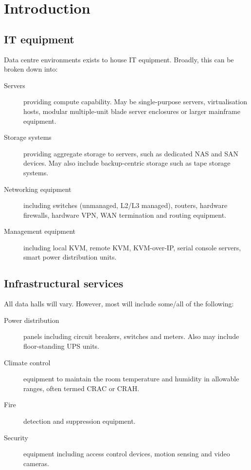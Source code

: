 \chapter{Introduction}
\label{sec:introduction}

\section{IT equipment}
\label{sec:it-equipment}

Data centre environments exists to house IT equipment.
Broadly, this can be broken down into:
\begin{description}
\item[Servers] providing compute capability. May be single-purpose servers, virtualisation hosts, modular multiple-unit blade server enclosures or larger mainframe equipment.
\item[Storage systems] providing aggregate storage to servers, such as dedicated NAS and SAN devices. May also include backup-centric storage such as tape storage systems.
\item[Networking equipment] including switches (unmanaged, L2/L3 managed), routers, hardware firewalls, hardware VPN, WAN termination and routing equipment.
\item[Management equipment] including local KVM, remote KVM, KVM-over-IP, serial console servers, smart power distribution units.
\end{description}

\section{Infrastructural services}
\label{sec:infrastructural-services}

All data halls will vary.
However, most will include some/all of the following:
\begin{description}
\item[Power distribution] panels including circuit breakers, switches and meters. Also may include floor-standing UPS units.
\item[Climate control] equipment to maintain the room temperature and humidity in allowable ranges, often termed CRAC or CRAH.
\item[Fire] detection and suppression equipment.
\item[Security] equipment including access control devices, motion sensing and video cameras.
\end{description}


